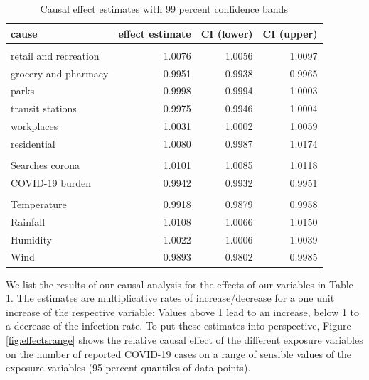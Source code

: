 \documentclass[]{elsarticle} %
\begin{document}
\begin{table}

\caption{\label{tab:causaleffects}Causal effect estimates with 99 percent confidence bands}
\centering
\begin{tabular}[t]{lrrr}
\toprule
cause & effect estimate & CI (lower) & CI (upper)\\
\midrule
\addlinespace[0.3em]
\multicolumn{4}{l}{\textbf{Mobility}}\\
\hspace{1em}retail and recreation & 1.0076 & 1.0056 & 1.0097\\
\hspace{1em}grocery and pharmacy & 0.9951 & 0.9938 & 0.9965\\
\hspace{1em}parks & 0.9998 & 0.9994 & 1.0003\\
\hspace{1em}transit stations & 0.9975 & 0.9946 & 1.0004\\
\hspace{1em}workplaces & 1.0031 & 1.0002 & 1.0059\\
\hspace{1em}residential & 1.0080 & 0.9987 & 1.0174\\
\addlinespace[0.3em]
\multicolumn{4}{l}{\textbf{Awareness}}\\
\hspace{1em}Searches corona & 1.0101 & 1.0085 & 1.0118\\
\hspace{1em}COVID-19 burden & 0.9942 & 0.9932 & 0.9951\\
\addlinespace[0.3em]
\multicolumn{4}{l}{\textbf{Weather}}\\
\hspace{1em}Temperature & 0.9918 & 0.9879 & 0.9958\\
\hspace{1em}Rainfall & 1.0108 & 1.0066 & 1.0150\\
\hspace{1em}Humidity & 1.0022 & 1.0006 & 1.0039\\
\hspace{1em}Wind & 0.9893 & 0.9802 & 0.9985\\
\bottomrule
\end{tabular}
\end{table}

We list the results of our causal analysis for the effects of our
variables in Table \ref{tab:causaleffects}. The estimates are
multiplicative rates of increase/decrease for a one unit increase of the
respective variable: Values above 1 lead to an increase, below 1 to a
decrease of the infection rate. To put these estimates into perspective,
Figure \ref{fig:effectsrange} shows the relative causal effect of the
different exposure variables on the number of reported COVID-19 cases on
a range of sensible values of the exposure variables (95 percent
quantiles of data points).
\end{document}
